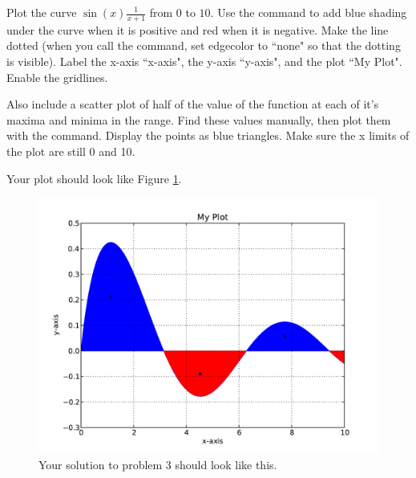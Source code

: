 \begin{problem} Plot the curve $\sin(x)\frac{1}{x+1}$ from $0$ to $10$.
Use the  command to add blue shading under the curve when it is positive and red when it is
negative.
Make the line dotted (when you call the  command, set edgecolor to ``none" so that the dotting is visible). Label the x-axis ``x-axis", the y-axis ``y-axis",
and the plot ``My Plot". Enable the gridlines.

Also include a scatter plot of half of the value of the function at each
of it's maxima and minima in the range. Find these values manually, then plot them with the  command. Display the points as
blue triangles. Make sure the x limits of the plot are still 0 and 10.

Your plot should look like Figure \ref{mpl:problem3}.
\end{problem}

\begin{figure}
\includegraphics[width=\textwidth]{prob3.pdf}
\caption{Your solution to problem 3 should look like this.}
\label{mpl:problem3} 
\end{figure}

